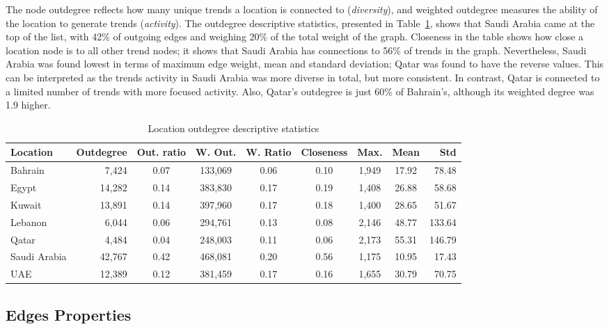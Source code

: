 \documentclass{llncs}
\begin{document}
The node outdegree reflects how many unique trends a location is
connected to ({\emph{diversity}}), and weighted outdegree measures the
ability of the location to generate trends ({\emph{activity}}). The
outdegree descriptive statistics, presented in
Table~\ref{tbl:locationoutdegree}, shows that Saudi Arabia came at the
top of the list, with 42\% of outgoing edges and weighing 20\% of the
total weight of the graph. Closeness in the table shows how close a
location node is to all other trend nodes; it shows that Saudi Arabia
has connections to 56\% of trends in the graph. Nevertheless, Saudi
Arabia was found lowest in terms of maximum edge weight, mean and
standard deviation; Qatar was found to have the reverse values. This
can be interpreted as the trends activity in Saudi Arabia was more
diverse in total, but more consistent. In contrast, Qatar is connected
to a limited number of trends with more focused activity. Also,
Qatar's outdegree is just 60\% of Bahrain's, although its weighted
degree was 1.9 higher.

\begin{table}[!h]
\centering
\caption{Location outdegree descriptive statistics}
\begin{tabular}{@{}lrccccccr@{}}
\toprule
Location & Outdegree & Out. ratio & W. Out. & W. Ratio & Closeness & Max. &  Mean & Std \\ 
\midrule
Bahrain &           7,424 & 0.07 & 133,069 & 0.06 & 0.10 & 1,949 & 17.92 &   78.48\\
Egypt &            14,282 & 0.14 & 383,830 & 0.17 & 0.19 & 1,408 & 26.88 &   58.68\\
Kuwait &          13,891 & 0.14 & 397,960 & 0.17 & 0.18 & 1,400 & 28.65 &   51.67\\
Lebanon &         6,044 & 0.06 & 294,761 & 0.13 & 0.08 & 2,146 & 48.77 & 133.64\\
Qatar &              4,484 & 0.04 & 248,003 & 0.11 & 0.06 & 2,173 & 55.31 & 146.79\\
Saudi Arabia & 42,767 & 0.42 & 468,081 & 0.20 & 0.56 & 1,175 & 10.95 &   17.43\\
UAE &              12,389 & 0.12 & 381,459 & 0.17 & 0.16 & 1,655 & 30.79 &   70.75\\
\bottomrule
\end{tabular}
\label{tbl:locationoutdegree}
\end{table}

\subsection{Edges Properties}
\end{document}
